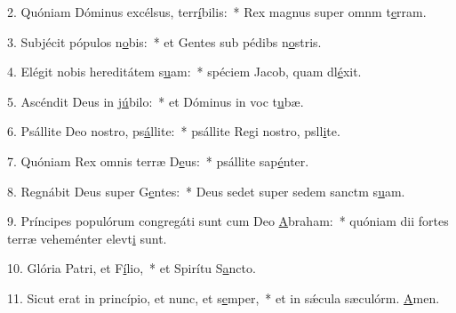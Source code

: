 2. Quóniam Dóminus excélsus, terr\uline{í}bilis:~* Rex magnus super omnm t\uline{e}rram.\par 
3. Subjécit pópulos n\uline{o}bis:~* et Gentes sub pédibs n\uline{o}stris.\par 
4. Elégit nobis hereditátem s\uline{u}am:~* spéciem Jacob, quam dl\uline{é}xit.\par 
5. Ascéndit Deus in j\uline{ú}bilo:~* et Dóminus in voc t\uline{u}bæ.\par 
6. Psállite Deo nostro, ps\uline{á}llite:~* psállite Regi nostro, psll\uline{i}te.\par 
7. Quóniam Rex omnis terræ D\uline{e}us:~* psállite sap\uline{é}nter.\par 
8. Regnábit Deus super G\uline{e}ntes:~* Deus sedet super sedem sanctm s\uline{u}am.\par 
9. Príncipes populórum congregáti sunt cum Deo \uline{A}braham:~* quóniam dii fortes terræ veheménter elevt\uline{i} sunt.\par 
10. Glória Patri, et F\uline{í}lio,~* et Spirítu S\uline{a}ncto.\par 
11. Sicut erat in princípio, et nunc, et s\uline{e}mper,~* et in sǽcula sæculórm. \uline{A}men.\par 
